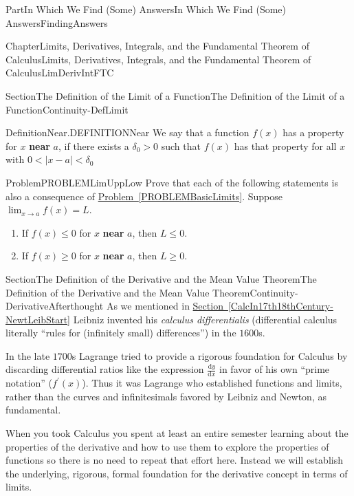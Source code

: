 \documentclass[oneside,10pt,]{book}
\newcommand{\xreffont}{\relax}
\newcommand{\terminology}[1]{\textbf{#1}}
\numberwithin{equation}{part}
\newcommand{\dfdx}[2]{\frac{\text{d}{#1}}{\text{d}{#2}}}
\def\limit#1#2#3{{\displaystyle\lim_{#1\rightarrow #2}#3}}
\newcommand{\lt}{<}
\begin{document}
\begin{partptx}{Part}{In Which We Find (Some) Answers}{}{In Which We Find (Some) Answers}{}{}{FindingAnswers}
\begin{chapterptx}{Chapter}{Limits, Derivatives, Integrals, and the Fundamental Theorem of Calculus}{}{Limits, Derivatives, Integrals, and the Fundamental Theorem of Calculus}{}{}{LimDerivIntFTC}
\begin{sectionptx}{Section}{The Definition of the Limit of a Function}{}{The Definition of the Limit of a Function}{}{}{Continuity-DefLimit}
\begin{definition}{Definition}{Near.}{DEFINITIONNear}
 We say that a function \(f(x)\) has a property for \(x\) \terminology{near} \(a\), if there exists a \({\delta }_0>0\) such that \(f(x)\) has that property for all \(x\) with \(0\lt\left|x-a\right|\lt{\delta
}_0\)%
\end{definition}
\begin{problem}{Problem}{}{PROBLEMLimUppLow}%
Prove that each of the following statements is also a consequence of \hyperref[PROBLEMBasicLimits]{Problem~{\xreffont\ref{PROBLEMBasicLimits}}}. Suppose \(\limit{x}{a}{f(x)}=L\).%
\begin{enumerate}[font=\bfseries,label=(\alph*),ref=\alph*]%
\item{}If \(f\left(x\right)\le 0\) for \(x\) \terminology{near} \(a\), then \(L\le 0\).%
\item{}If \(f\left(x\right)\ge 0\) for \(x\) \terminology{near} \(a\), then \(L\ge 0\).%
\end{enumerate}%
\end{problem}
\end{sectionptx}
%
%
\typeout{************************************************}
\typeout{************************************************}
%
\begin{sectionptx}{Section}{The Definition of  the Derivative and the Mean Value Theorem}{}{The Definition of  the Derivative and the Mean Value Theorem}{}{}{Continuity-DerivativeAfterthought}
As we mentioned in \hyperref[CalcIn17th18thCentury-NewtLeibStart]{Section~{\xreffont\ref{CalcIn17th18thCentury-NewtLeibStart}}} Leibniz invented his \textit{calculus differentialis} (differential calculus \textemdash{} literally ``rules for (infinitely small) differences'') in the \(1600\)s.%
\par
In the late \(1700\)s Lagrange tried to provide a rigorous foundation for Calculus by discarding differential ratios like the expression \(\dfdx{y}{x} \) in favor of his own ``prime notation'' (\(f^\prime(x) \)). Thus it was Lagrange who established functions and limits, rather than the curves and infinitesimals favored by Leibniz and Newton, as fundamental.%
\par
When you took Calculus you spent at least an entire semester learning about the properties of the derivative and how to use them to explore the properties of functions so there is no need to repeat that effort here. Instead we will establish the underlying, rigorous, formal foundation for the derivative concept in terms of limits.%

\end{sectionptx}
\end{chapterptx}
\end{partptx}
\end{document}
